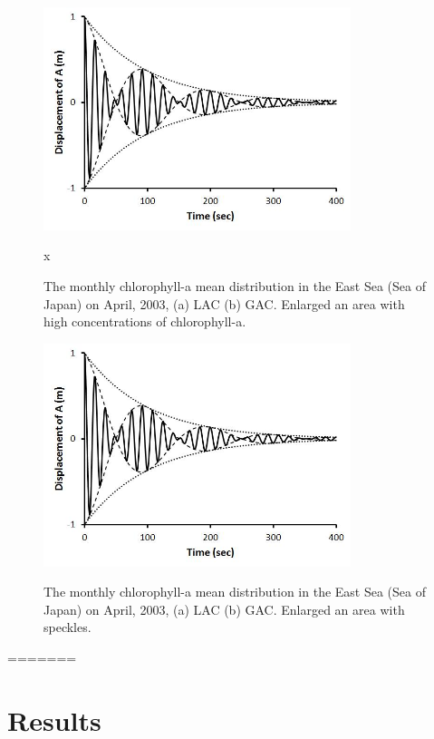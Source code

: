   \begin{figure}[h]
  	\centering
  	\includegraphics[width=0.8\textwidth]{../images/monHISHI}\\
  	\caption{The monthly chlorophyll-a mean distribution in the East Sea (Sea of Japan) on April, 2003, (a) LAC (b) GAC. Enlarged an area with high concentrations of chlorophyll-a.}
  	\label{fig:monHISHI}x
  \end{figure}
  
    \begin{figure}[h]
  	\centering
  	\includegraphics[width=0.8\textwidth]{../images/monHISSPEC}\\
  	\caption{The monthly chlorophyll-a mean distribution in the East Sea (Sea of Japan) on April, 2003, (a) LAC (b) GAC. Enlarged an area with speckles.}
  	\label{fig:monHISSPEC}
  \end{figure}
=======

\section{Results}

